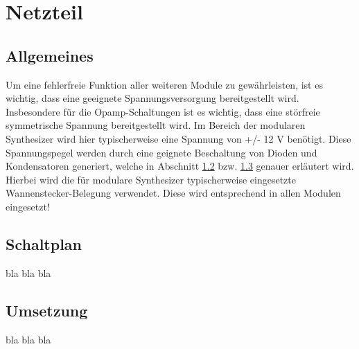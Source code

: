 \chapter{Netzteil}
\label{ch:Netzteil}

\section{Allgemeines}
Um eine fehlerfreie Funktion aller weiteren Module zu gewährleisten, ist es wichtig, dass eine geeignete Spannungsversorgung bereitgestellt wird. 
Insbesondere für die Opamp-Schaltungen ist es wichtig, dass eine störfreie symmetrische Spannung bereitgestellt wird. 
Im Bereich der modularen Synthesizer wird hier typischerweise eine Spannung von +/- 12 V benötigt. Diese Spannungspegel werden durch eine geignete Beschaltung von Dioden und Kondensatoren generiert, welche in Abschnitt \ref{sec:netzteil_schaltplan} bzw. \ref{sec:netzteil_umsetzung} genauer erläutert wird. Hierbei wird die für modulare Synthesizer typischerweise eingesetzte Wannenstecker-Belegung verwendet. Diese wird entsprechend in allen Modulen eingesetzt!


\section{Schaltplan}
\label{sec:netzteil_schaltplan}
bla bla bla

\section{Umsetzung}
\label{sec:netzteil_umsetzung}
bla bla bla